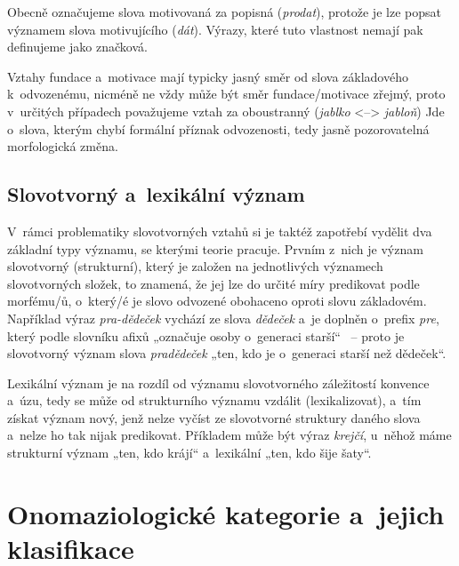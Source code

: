 Obecně označujeme slova motivovaná za popisná (\emph{prodat}), protože
je lze popsat významem slova motivujícího (\emph{dát}). Výrazy, které
tuto vlastnost nemají pak definujeme jako značková.
\parencite[96]{dokulil00}

Vztahy fundace a~motivace mají typicky jasný směr od slova základového
k~odvozenému, nicméně ne vždy může být směr fundace/motivace zřejmý, proto
v~určitých případech považujeme vztah za oboustranný (\emph{jablko}
\textless{}--\textgreater{} \emph{jabloň}) Jde o~slova, kterým chybí
formální příznak odvozenosti, tedy jasně pozorovatelná morfologická
změna.~\parencite[96]{dokulil00}

\hypertarget{slovotvornuxfd-a-lexikuxe1lnuxed-vuxfdznam}{%
\subsection{Slovotvorný a~lexikální
význam}\label{slovotvornuxfd-a-lexikuxe1lnuxed-vuxfdznam}}

V~rámci problematiky slovotvorných vztahů si je taktéž zapotřebí vydělit
dva základní typy významu, se kterými teorie pracuje. Prvním z~nich je
význam slovotvorný (strukturní), který je založen na jednotlivých
významech slovotvorných složek, to znamená, že jej lze do určité míry
predikovat podle morfému/ů, o~který/é je slovo odvozené obohaceno oproti
slovu základovém.~\parencite{enc-slovot-vyznam17} Například výraz
\emph{pra-dědeček} vychází ze slova \emph{dědeček} a~je doplněn o~prefix
\emph{pre}, který podle slovníku afixů „označuje osoby o~generaci
starší``~\parencite{simandl2016} -- proto je slovotvorný význam slova
\emph{pradědeček} „ten, kdo je o~generaci starší než dědeček``.

Lexikální význam je na rozdíl od významu slovotvorného záležitostí
konvence a~úzu, tedy se může od strukturního významu vzdálit
(lexikalizovat), a~tím získat význam nový, jenž nelze vyčíst ze
slovotvorné struktury daného slova a~nelze ho tak nijak predikovat.
Příkladem může být výraz \emph{krejčí}, u~něhož máme strukturní význam
„ten, kdo krájí`` a~lexikální „ten, kdo šije šaty``.
\parencite{enc-slovot-vyznam17}

\hypertarget{onomaziologickuxe9-kategorie-a-jejich-klasifikace}{%
\section{Onomaziologické kategorie a~jejich
klasifikace}\label{onomaziologickuxe9-kategorie-a-jejich-klasifikace}}


